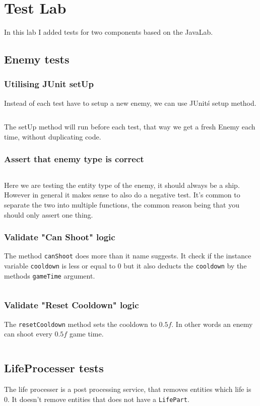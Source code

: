 \section{Test Lab}

In this lab I added tests for two components based on the JavaLab.

\subsection{Enemy tests}
\subsubsection{Utilising JUnit setUp}
Instead of each test have to setup a new enemy, we can use JUnit\'s setup
method.
\inputminted{java}{code/test_lab/enemy/setup.java}
The setUp method will run before each test, that way we get a fresh Enemy each
time, without duplicating code.


\subsubsection{Assert that enemy type is correct}
\inputminted{java}{code/test_lab/enemy/entity_type.java}
Here we are testing the entity type of the enemy, it should always be a ship.
However in general it makes sense to also do a negative test.
It's common to separate the two into multiple functions, the common reason being that you should only
assert one thing.

\subsubsection{Validate "Can Shoot" logic}
The method \texttt{canShoot} does more than it name suggests. It check if the
instance variable \texttt{cooldown} is less or equal to $0$ but it also deducts
the \texttt{cooldown} by the methods \texttt{gameTime} argument.

\inputminted{java}{code/test_lab/enemy/can_shoot.java}

\subsubsection{Validate "Reset Cooldown" logic}
The \texttt{resetCooldown} method sets the cooldown to $0.5f$. In other words an enemy can shoot every $0.5f$ game time.

\inputminted{java}{code/test_lab/enemy/reset_cooldown.java}

\subsection{LifeProcesser tests}
The life processer is a post processing service, that removes entities which
life is 0. It doesn't remove entities that does not have a \texttt{LifePart}.
\inputminted{java}{code/test_lab/life_processer.java}
